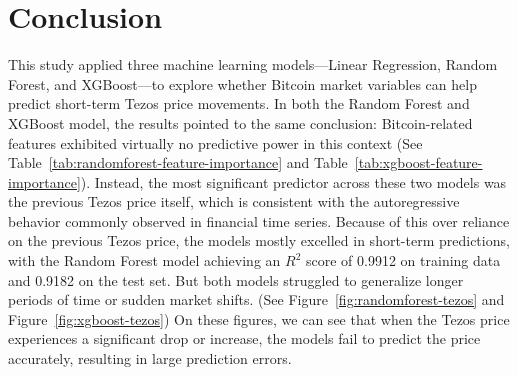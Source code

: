 
\chapter{Conclusion}%
\label{ch:conclusion}

This study applied three machine learning models—Linear Regression, Random Forest, and XGBoost—to explore whether Bitcoin market variables can help predict short-term Tezos price movements. 
In both the Random Forest and XGBoost model, the results pointed to the same conclusion: Bitcoin-related features exhibited virtually no predictive power in this context (See Table~\ref{tab:randomforest-feature-importance} and Table~\ref{tab:xgboost-feature-importance}).
Instead, the most significant predictor across these two models was the previous Tezos price itself, which is consistent with the autoregressive behavior commonly observed in financial time series. 
Because of this over reliance on the previous Tezos price, the models mostly excelled in short-term predictions, with the Random Forest model achieving an $R^2$ score of 0.9912 on training data and 0.9182 on the test set. 
But both models struggled to generalize longer periods of time or sudden market shifts. (See Figure~\ref{fig:randomforest-tezos} and Figure~\ref{fig:xgboost-tezos}) On these figures, we can see that when the Tezos price experiences a significant drop or increase, the models fail to predict the price accurately, resulting in large prediction errors.

